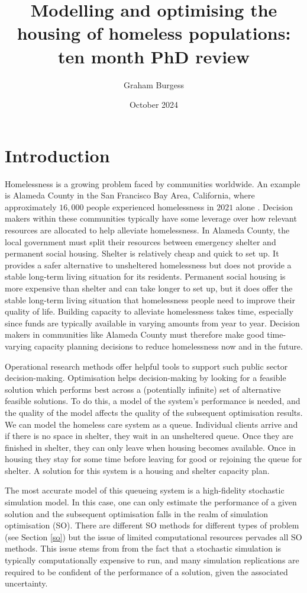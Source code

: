 \documentclass[12pt,a4paper]{article}
\title{Modelling and optimising the housing of homeless populations: ten month PhD review}
\author{Graham Burgess}
\date{October 2024}
\begin{document}
%
\maketitle
%
\section{Introduction}
%
Homelessness is a growing problem faced by communities worldwide. An example is Alameda County in the San Francisco Bay Area, California, where approximately $16,000$ people experienced homelessness in $2021$ alone \citep{racial2021}. Decision makers within these communities typically have some leverage over how relevant resources are allocated to help alleviate homelessness. In Alameda County, the local government must split their resources between emergency shelter and permanent social housing. Shelter is relatively cheap and quick to set up. It provides a safer alternative to unsheltered homelessness but does not provide a stable long-term living situation for its residents. Permanent social housing is more expensive than shelter and can take longer to set up, but it does offer the stable long-term living situation that homelessness people need to improve their quality of life. Building capacity to alleviate homelessness takes time, especially since funds are typically available in varying amounts from year to year. Decision makers in communities like Alameda County must therefore make good time-varying capacity planning decisions to reduce homelessness now and in the future.

Operational research methods offer helpful tools to support such public sector decision-making. Optimisation helps decision-making by looking for a feasible solution which performs best across a (potentially infinite) set of alternative feasible solutions. To do this, a model of the system's performance is needed, and the quality of the model affects the quality of the subsequent optimisation results. We can model the homeless care system as a queue. Individual clients arrive and if there is no space in shelter, they wait in an unsheltered queue. Once they are finished in shelter, they can only leave when housing becomes available. Once in housing they stay for some time before leaving for good or rejoining the queue for shelter. A solution for this system is a housing and shelter capacity plan. 

The most accurate model of this queueing system is a high-fidelity stochastic simulation model. In this case, one can only estimate the performance of a given solution and the subsequent optimisation falls in the realm of simulation optimisation (SO). There are different SO methods for different types of problem (see Section \ref{so}) but the issue of limited computational resources pervades all SO methods. This issue stems from from the fact that a stochastic simulation is typically computationally expensive to run, and many simulation replications are required to be confident of the performance of a solution, given the associated uncertainty.
\end{document}
